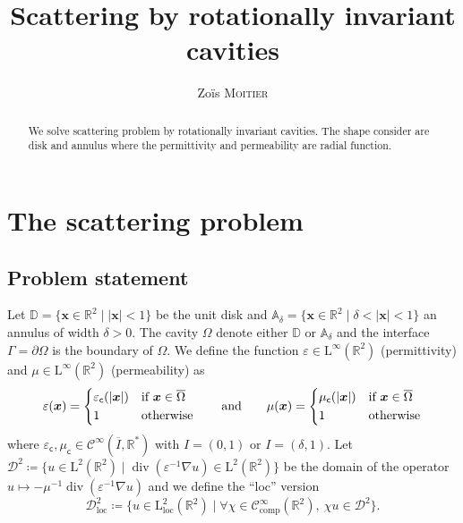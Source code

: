 \documentclass[12pt,a4paper]{article}
\title{Scattering by rotationally invariant cavities}
\author{Zoïs \textsc{Moitier}}
\newcommand{\bbA}{\mathbb{A}}
\newcommand{\bbD}{\mathbb{D}}
\newcommand{\bbR}{\mathbb{R}}
\newcommand{\calD}{\mathcal{D}}
\newcommand{\scrC}{\mathscr{C}}
\newcommand{\rmL}{\mathrm{L}}
\DeclareMathOperator{\Div}{div}
\newcommand{\vx}{\boldsymbol{x}}
\newcommand{\eps}{\varepsilon}
\newcommand{\comp}{\mathrm{comp}}
\newcommand{\loc}{\mathrm{loc}}
\newcommand{\ecav}{\varepsilon_\mathsf{c}}
\newcommand{\mcav}{\mu_\mathsf{c}}
\begin{document}
\maketitle

\begin{abstract}
    We solve scattering problem by rotationally invariant cavities.
    The shape consider are disk and annulus where the permittivity and permeability are radial function.
\end{abstract}

\tableofcontents

\section{The scattering problem}

\subsection{Problem statement}

Let $\bbD = \{\vx \in \bbR^2 \mid |\vx| < 1\}$ be the unit disk and $\bbA_\delta = \{\vx \in \bbR^2 \mid \delta < |\vx| < 1\}$ an annulus of width $\delta > 0$.
The cavity $\Omega$ denote either $\bbD$ or $\bbA_\delta$ and the interface $\Gamma = \partial\Omega$ is the boundary of $\Omega$.
We define the function $\eps \in \rmL^\infty(\bbR^2)$ (permittivity) and $\mu \in \rmL^\infty(\bbR^2)$ (permeability) as
\[
    \eps(\vx) = \begin{dcases}
        \ecav(|\vx|) & \text{if } \vx \in \overline{\Omega}\\
        1 & \text{otherwise}
    \end{dcases} \qquad
    \text{and} \qquad
    \mu(\vx) = \begin{dcases}
        \mcav(|\vx|) & \text{if } \vx \in \overline{\Omega}\\
        1 & \text{otherwise}
    \end{dcases}
\]
where $\ecav, \mcav \in \scrC^\infty(\overline{I}, \bbR^*)$ with $I = (0,1)$ or $I = (\delta, 1)$.
Let $\calD^2 \coloneqq \{u \in \rmL^2(\bbR^2) \mid \Div(\eps^{-1} \nabla u) \in \rmL^2(\bbR^2)\}$ be the domain of the operator $u \mapsto -\mu^{-1}\Div(\eps^{-1} \nabla u)$ and we define the ``loc'' version
\[
    \calD_\loc^2 \coloneqq \{u \in \rmL_\loc^2(\bbR^2) \mid \forall \chi \in \scrC_\comp^\infty(\bbR^2),\ \chi u \in \calD^2\}.
\]
\end{document}
